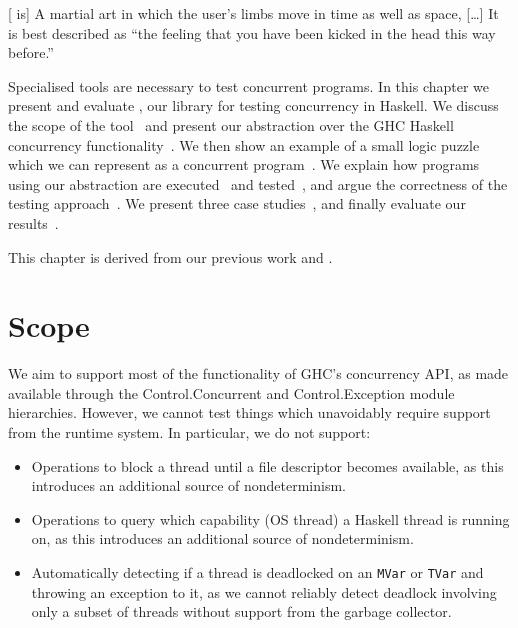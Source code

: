 \begin{displayquote}
  {[}\dejafu{} is] A martial art in which the user's limbs move in
  time as well as space, [\ldots] It is best described as ``the
  feeling that you have been kicked in the head this way
  before.''\cite{pratchett2001}
\end{displayquote}

\noindent
Specialised tools are necessary to test concurrent programs.  In this
chapter we present and evaluate \dejafu{}, our library for testing
concurrency in Haskell.  We discuss the scope of the
tool~ and present our abstraction over the GHC
Haskell concurrency functionality~.  We then
show an example of a small logic puzzle which we can represent as a
concurrent program~.  We explain how programs using
our abstraction are executed~ and
tested~, and argue the correctness of the testing
approach~.  We present three case
studies~, and finally evaluate our
results~.

This chapter is derived from our previous work \cite{YCS-2016-503} and
\cite{walker2015}.

\section{Scope}
\label{sec:dejafu-scope}

We aim to support most of the functionality of GHC’s concurrency API,
as made available through the
Control.Concurrent\cite{control_concurrent} and
Control.Exception\cite{control_exception} module hierarchies.
However, we cannot test things which unavoidably require support from
the runtime system.  In particular, we do not support:

\begin{itemize}
\item Operations to block a thread until a file descriptor becomes
  available, as this introduces an additional source of
  nondeterminism.
\item Operations to query which capability (OS thread) a Haskell
  thread is running on, as this introduces an additional source of
  nondeterminism.
\item Automatically detecting if a thread is deadlocked on an
  \verb|MVar| or \verb|TVar| and throwing an exception to it, as we
  cannot reliably detect deadlock involving only a subset of threads
  without support from the garbage collector.
\end{itemize}

